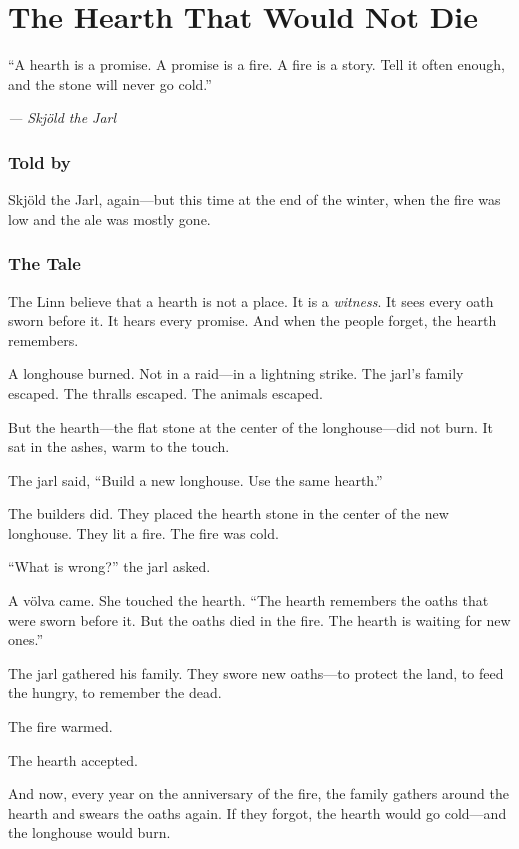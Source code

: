 \documentclass[9pt,a5paper]{extbook}
\begin{document}
\clearpage

\chapter{The Hearth That Would Not Die}

\epigraph{``A hearth is a promise. A promise is a fire. A fire is a story. Tell it often enough, and the stone will never go cold.''}{\textit{--- Skjöld the Jarl}}

\subsection*{Told by}

Skjöld the Jarl, again---but this time at the end of the winter, when the fire was low and the ale was mostly gone.

\subsection*{The Tale}

The Linn believe that a hearth is not a place. It is a \textit{witness}. It sees every oath sworn before it. It hears every promise. And when the people forget, the hearth remembers.

A longhouse burned. Not in a raid---in a lightning strike. The jarl's family escaped. The thralls escaped. The animals escaped.

But the hearth---the flat stone at the center of the longhouse---did not burn. It sat in the ashes, warm to the touch.

The jarl said, ``Build a new longhouse. Use the same hearth.''

The builders did. They placed the hearth stone in the center of the new longhouse. They lit a fire. The fire was cold.

``What is wrong?'' the jarl asked.

A völva came. She touched the hearth. ``The hearth remembers the oaths that were sworn before it. But the oaths died in the fire. The hearth is waiting for new ones.''

The jarl gathered his family. They swore new oaths---to protect the land, to feed the hungry, to remember the dead.

The fire warmed.

The hearth accepted.

And now, every year on the anniversary of the fire, the family gathers around the hearth and swears the oaths again. If they forgot, the hearth would go cold---and the longhouse would burn.
\end{document}
